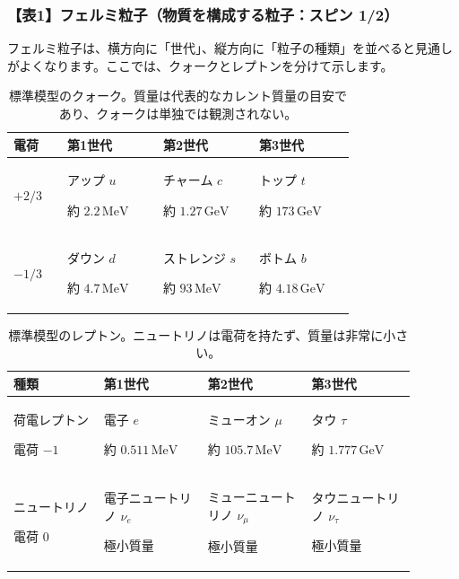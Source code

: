 \subsubsection{【表1】フェルミ粒子（物質を構成する粒子：スピン 1/2）}

フェルミ粒子は、横方向に「世代」、縦方向に「粒子の種類」を並べると見通しがよくなります。ここでは、クォークとレプトンを分けて示します。

\begin{table}[htbp]
\centering
\small
\setlength{\tabcolsep}{4pt}
\renewcommand{\arraystretch}{1.25}
\begin{tabular}{p{0.14\linewidth}p{0.25\linewidth}p{0.25\linewidth}p{0.25\linewidth}}
\hline
電荷 & 第1世代 & 第2世代 & 第3世代 \\
\hline
\(+2/3\) & アップ \(u\)\par 約 \(2.2\,\mathrm{MeV}\) & チャーム \(c\)\par 約 \(1.27\,\mathrm{GeV}\) & トップ \(t\)\par 約 \(173\,\mathrm{GeV}\) \\
\(-1/3\) & ダウン \(d\)\par 約 \(4.7\,\mathrm{MeV}\) & ストレンジ \(s\)\par 約 \(93\,\mathrm{MeV}\) & ボトム \(b\)\par 約 \(4.18\,\mathrm{GeV}\) \\
\hline
\end{tabular}
\caption{標準模型のクォーク。質量は代表的なカレント質量の目安であり、クォークは単独では観測されない。}
\end{table}

\begin{table}[htbp]
\centering
\small
\setlength{\tabcolsep}{4pt}
\renewcommand{\arraystretch}{1.25}
\begin{tabular}{p{0.20\linewidth}p{0.23\linewidth}p{0.23\linewidth}p{0.23\linewidth}}
\hline
種類 & 第1世代 & 第2世代 & 第3世代 \\
\hline
荷電レプトン\par 電荷 \(-1\) & 電子 \(e\)\par 約 \(0.511\,\mathrm{MeV}\) & ミューオン \(\mu\)\par 約 \(105.7\,\mathrm{MeV}\) & タウ \(\tau\)\par 約 \(1.777\,\mathrm{GeV}\) \\
ニュートリノ\par 電荷 \(0\) & 電子ニュートリノ \(\nu_e\)\par 極小質量 & ミューニュートリノ \(\nu_\mu\)\par 極小質量 & タウニュートリノ \(\nu_\tau\)\par 極小質量 \\
\hline
\end{tabular}
\caption{標準模型のレプトン。ニュートリノは電荷を持たず、質量は非常に小さい。}
\end{table}

